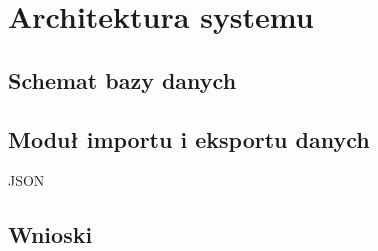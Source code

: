 \newpage\section{Architektura systemu \NazwaSys}\label{sec:model}
\subsection{Schemat bazy danych} \label{subsec:schemat}
\subsection{Moduł importu i eksportu danych}
JSON
\subsection{Wnioski}
\begin{itemize}
	\end{itemize}
